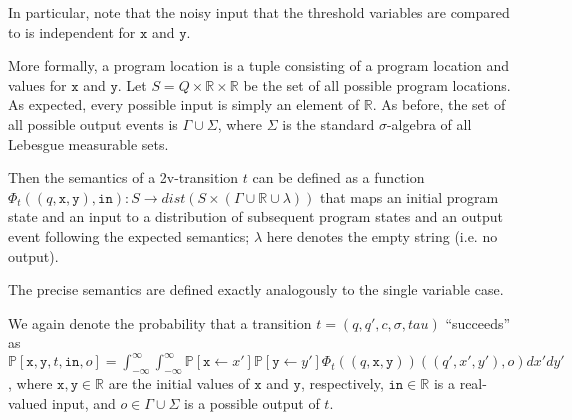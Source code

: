 \documentclass[12pt]{article}
\newcommand{\RR}{\mathbb{R}}
\newcommand{\PP}{\mathbb{P}}
\theoremstyle{definition}
\begin{document}
In particular, note that the noisy input that the threshold variables are compared to is independent for $\texttt{x}$ and $\texttt{y}$.

More formally, a program location is a tuple consisting of a program location and values for $\texttt{x}$ and $\texttt{y}$. Let $S = Q\times\RR\times \RR$ be the set of all possible program locations. As expected, every possible input is simply an element of $\RR$. 
As before, the set of all possible output events is $\Gamma \cup \Sigma$, where $\Sigma$ is the standard $\sigma$-algebra of all Lebesgue measurable sets. 

Then the semantics of a 2v-transition $t$ can be defined as a function $\Phi_t((q, \texttt{x}, \texttt{y}), \texttt{in}): S\to dist(S\times (\Gamma\cup\RR\cup \lambda))$ that maps an initial program state and an input to a distribution of subsequent program states and an output event following the expected semantics; $\lambda$ here denotes the empty string (i.e. no output). 

The precise semantics are defined exactly analogously to the single variable case. 

We again denote the probability that a transition $t= (q, q', c, \sigma, tau)$ ``succeeds'' as $\PP[\texttt{x}, \texttt{y}, t, \texttt{in}, o] = \int_{-\infty}^{\infty}\int_{-\infty}^{\infty}\PP[\texttt{x}\gets x']\PP[\texttt{y}\gets y']\Phi_t((q, \texttt{x}, \texttt{y}))((q', x', y'), o)dx'dy'$, where $\texttt{x}, \texttt{y}\in \RR$ are the initial values of $\texttt{x}$ and $\texttt{y}$, respectively, $\texttt{in}\in \RR$ is a real-valued input, and $o\in \Gamma\cup\Sigma$ is a possible output of $t$.
\end{document}

